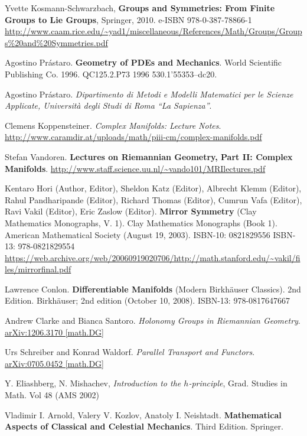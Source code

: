 \documentclass[10pt]{amsart}
\begin{document}
\begin{thebibliography}{9}
Yvette Kosmann-Schwarzbach, \textbf{Groups and Symmetries: From Finite Groups to Lie Groups}, Springer, 2010. e-ISBN 978-0-387-78866-1 \url{http://www.caam.rice.edu/~yad1/miscellaneous/References/Math/Groups/Groups\%20and\%20Symmetries.pdf}

Agostino Pr\'{a}staro.  \textbf{Geometry of PDEs and Mechanics}.  World Scientific Publishing Co.  1996.  QC125.2.P73 1996  530.1'55353--dc20.  

Agostino Pr\'{a}staro.  \emph{Dipartimento di Metodi e Modelli Matematici per le Scienze Applicate, Universit\`{a} degli Studi di Roma ``La Sapienza''}.  

  Clemens Koppensteiner.  \emph{Complex Manifolds: Lecture Notes}.  \url{http://www.caramdir.at/uploads/math/piii-cm/complex-manifolds.pdf}
  

Stefan Vandoren. \textbf{Lectures on Riemannian Geometry, Part II: Complex Manifolds}.  \url{http://www.staff.science.uu.nl/~vando101/MRIlectures.pdf} 

Kentaro Hori (Author, Editor), Sheldon Katz (Editor), Albrecht Klemm (Editor), Rahul Pandharipande (Editor), Richard Thomas (Editor), Cumrun Vafa (Editor), Ravi Vakil (Editor), Eric Zaslow (Editor).  \textbf{Mirror Symmetry} (Clay Mathematics Monographs, V. 1).  Clay Mathematics Monographs (Book 1).  American Mathematical Society (August 19, 2003).  ISBN-10: 0821829556  ISBN-13: 978-0821829554  \url{https://web.archive.org/web/20060919020706/http://math.stanford.edu/~vakil/files/mirrorfinal.pdf}

Lawrence Conlon.  \textbf{Differentiable Manifolds} (Modern Birkhäuser Classics).  2nd Edition.  Birkhäuser; 2nd edition (October 10, 2008).  ISBN-13: 978-0817647667




Andrew Clarke and Bianca Santoro.  \emph{Holonomy Groups in Riemannian Geometry}.  \href{https://arxiv.org/pdf/1206.3170.pdf}{arXiv:1206.3170 [math.DG]}

Urs Schreiber and Konrad Waldorf.  \emph{Parallel Transport and Functors}.  \href{https://arxiv.org/pdf/0705.0452.pdf}{arXiv:0705.0452 [math.DG]}

Y. Eliashberg, N. Mishachev, \emph{Introduction to the $h$-principle}, Grad. Studies in Math. Vol 48 (AMS 2002)


Vladimir I. Arnold, Valery V. Kozlov, Anatoly I. Neishtadt.  \textbf{Mathematical Aspects of Classical and Celestial Mechanics}.  Third Edition.  Springer.  


\end{thebibliography}
\end{document}
